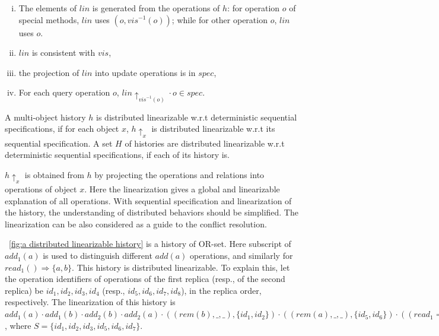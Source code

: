 {\begin{definition}
\begin{enumerate}[(i)]
\item The elements of $\mathit{lin}$ is generated from the operations of $h$: for operation $o$ of special methods, $\mathit{lin}$ uses $(o,\mathit{vis}^{-1}(o))$; while for other operation $o$, $\mathit{lin}$ uses $o$.
\item $\mathit{lin}$ is consistent with $\mathit{vis}$,
\item the projection of $\mathit{lin}$ into update operations is in $\mathit{spec}$,
\item For each query operation $o$, $\mathit{lin} \uparrow_{ \mathit{vis}^{-1}(o)  } \cdot o \in \mathit{spec}$.
\end{enumerate}

A multi-object history $h$ is distributed linearizable w.r.t deterministic sequential specifications, if for each object $x$, $h \uparrow_{x}$ is distributed linearizable w.r.t its sequential specification. A set $H$ of histories are distributed linearizable w.r.t deterministic sequential specifications, if each of its history is.
\end{definition}

$h \uparrow_{x}$ is obtained from $h$ by projecting the operations and relations into operations of object $x$. Here the linearization gives a global and linearizable explanation of all operations. With sequential specification and linearization of the history, the understanding of distributed behaviors should be simplified. The linearization can be also considered as a guide to the conflict resolution.

\figurename~\ref{fig:a distributed linearizable history} is a history of OR-set. Here subscript of $\mathit{add}_1(a)$ is used to distinguish different $\mathit{add}(a)$ operations, and similarly for $\mathit{read}_1() \Rightarrow \{ a,b \}$. This history is distributed linearizable. To explain this, let the operation identifiers of operations of the first replica (resp., of the second replica) be $\mathit{id}_1,\mathit{id}_2,\mathit{id}_3,\mathit{id}_4$ (resp., $\mathit{id}_5,\mathit{id}_6,\mathit{id}_7,\mathit{id}_8$), in the replica order, respectively. The linearization of this history is $\mathit{add}_1(a) \cdot \mathit{add}_1(b) \cdot \mathit{add}_2(b) \cdot \mathit{add}_2(a) \cdot ((\mathit{rem}(b),\_,\_),\{ \mathit{id}_1, \mathit{id}_2 \}) \cdot ((\mathit{rem}(a),\_,\_),\{ \mathit{id}_5, \mathit{id}_6 \}) \cdot ((\mathit{read}_1 \Rightarrow \{ a,b \},\_,\_), S ) \cdot ((\mathit{read}_2 \Rightarrow \{ a,b \},\_,\_), S )$, where $S = \{ \mathit{id}_1, \mathit{id}_2, \mathit{id}_3, \mathit{id}_5, \mathit{id}_6, \mathit{id}_7 \}$.

}
